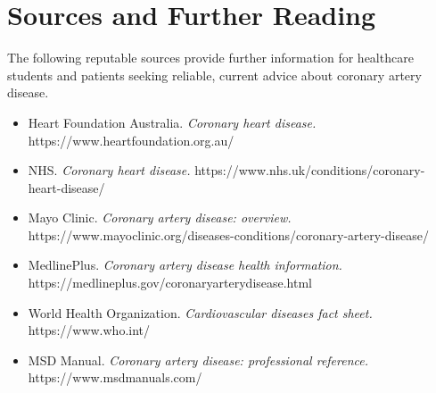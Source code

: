 \section*{Sources and Further Reading}
The following reputable sources provide further information for healthcare students and patients seeking reliable, current advice about coronary artery disease.

\begin{itemize}
    \item Heart Foundation Australia. \textit{Coronary heart disease.} https://www.heartfoundation.org.au/
    \item NHS. \textit{Coronary heart disease.} https://www.nhs.uk/conditions/coronary-heart-disease/
    \item Mayo Clinic. \textit{Coronary artery disease: overview.} https://www.mayoclinic.org/diseases-conditions/coronary-artery-disease/
    \item MedlinePlus. \textit{Coronary artery disease health information.} https://medlineplus.gov/coronaryarterydisease.html
    \item World Health Organization. \textit{Cardiovascular diseases fact sheet.} https://www.who.int/
    \item MSD Manual. \textit{Coronary artery disease: professional reference.} https://www.msdmanuals.com/
\end{itemize}
